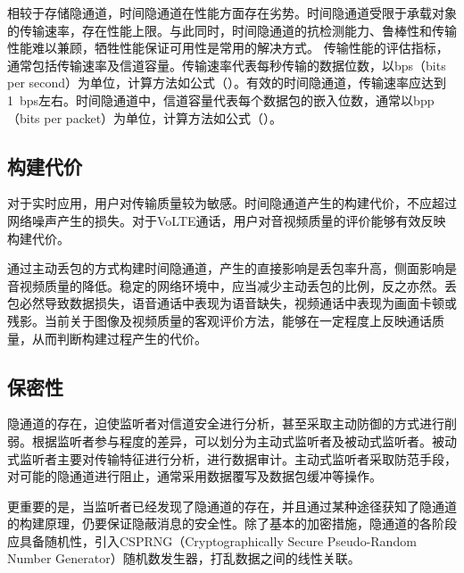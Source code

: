 相较于存储隐通道，时间隐通道在性能方面存在劣势。时间隐通道受限于承载对象的传输速率，存在性能上限。与此同时，时间隐通道的抗检测能力、鲁棒性和传输性能难以兼顾，牺牲性能保证可用性是常用的解决方式。
传输性能的评估指标，通常包括传输速率及信道容量。传输速率代表每秒传输的数据位数，以bps（bits per second）为单位，计算方法如公式（）。有效的时间隐通道，传输速率应达到{1\ bps}左右。时间隐通道中，信道容量代表每个数据包的嵌入位数，通常以bpp（bits per packet）为单位，计算方法如公式（）。

\subsection{构建代价}
\label{chap:backinfo:metric:cost}

对于实时应用，用户对传输质量较为敏感。时间隐通道产生的构建代价，不应超过网络噪声产生的损失。对于VoLTE通话，用户对音视频质量的评价能够有效反映构建代价。

通过主动丢包的方式构建时间隐通道，产生的直接影响是丢包率升高，侧面影响是音视频质量的降低。稳定的网络环境中，应当减少主动丢包的比例，反之亦然。丢包必然导致数据损失，语音通话中表现为语音缺失，视频通话中表现为画面卡顿或残影。当前关于图像及视频质量的客观评价方法，能够在一定程度上反映通话质量，从而判断构建过程产生的代价。

\subsection{保密性}
\label{chap:backinfo:metric:non-disclosure}

隐通道的存在，迫使监听者对信道安全进行分析，甚至采取主动防御的方式进行削弱。根据监听者参与程度的差异，可以划分为主动式监听者及被动式监听者。被动式监听者主要对传输特征进行分析，进行数据审计。主动式监听者采取防范手段，对可能的隐通道进行阻止，通常采用数据覆写及数据包缓冲等操作。

更重要的是，当监听者已经发现了隐通道的存在，并且通过某种途径获知了隐通道的构建原理，仍要保证隐蔽消息的安全性。除了基本的加密措施，隐通道的各阶段应具备随机性，引入CSPRNG（Cryptographically Secure Pseudo-Random Number Generator）随机数发生器，打乱数据之间的线性关联。